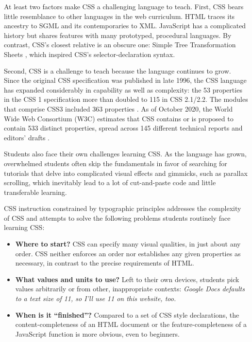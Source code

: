 \documentclass[sigplan,screen]{acmart}
\begin{document}
At least two factors make CSS a challenging language to teach. First, CSS bears little resemblance to other languages in the web curriculum. HTML traces its ancestry to SGML and its contemporaries to XML. JavaScript has a complicated history but shares features with many prototyped, procedural languages. By contrast, CSS’s closest relative is an obscure one: Simple Tree Transformation Sheets \cite{w3c:briefhistory}, which inspired CSS's selector-declaration syntax.

Second, CSS is a challenge to teach because the language continues to grow. Since the original CSS specification was published in late 1996, the CSS language has expanded considerably in capability as well as complexity: the 53 properties in the CSS 1 specification more than doubled to 115 in CSS 2.1/2.2. The modules that comprise CSS3 included  363 properties \cite{jom:css}. As of October 2020, the World Wide Web Consortium (W3C) estimates that CSS contains or is proposed to contain 533 distinct properties, spread across 145 different technical reports and editors' drafts \cite{w3c:iop}.

 Students also face their own challenges learning CSS. As the language has grown, overwhelmed students often skip the fundamentals in favor of searching for tutorials that delve into complicated visual effects and gimmicks, such as parallax scrolling, which inevitably lead to a lot of cut-and-paste code and little transferable learning.

CSS instruction constrained by typographic principles addresses the  complexity of CSS and attempts to solve the following problems students routinely face learning CSS:

\begin{itemize}
  \item \textbf{Where to start?} CSS can specify many visual qualities,  in just about any order. CSS neither enforces an order nor establishes any given properties as necessary, in contrast to the precise requirements of HTML.
  \item \textbf{What values and units to use?} Left to their own devices, students pick values arbitrarily or from other, inappropriate contexts: {\itshape Google Docs defaults to a text size of 11, so I’ll use 11 on this website, too.}
  \item \textbf{When is it “finished”?} Compared to a set of CSS style declarations, the content-completeness of an HTML document or the feature-completeness of a JavaScript function is more obvious, even to beginners.
\end{itemize}
\end{document}
